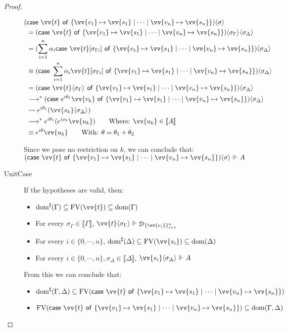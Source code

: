 \documentclass[runningheads,orivec,envcountsame,envcountsect]{llncs}
\newcommand\lra{\longrightarrow}
\newcommand\ansubst[2]{\ensuremath{\langle #1 \rangle_{#2}}}
\newcommand\dom[1]{\mathrm{dom}(#1)}
\newcommand\sdom[1]{\mathrm{dom}^{\sharp}(#1)}
\newcommand\FV[1]{\mathrm{FV}(#1)}
\def\gencase#1#2#3#4#5{\ensuremath{\mathsf{case}~#1~\mathsf{of}~\{#2\mapsto #4 \mid \dotsb \mid #3\mapsto #5\}}}
\def\lraneq{\rightsquigarrow}
\def\eval{\lra^*}
\def\sem#1{\llbracket#1\rrbracket}
\def\real{\Vdash}
\newcommand\basis[1]{\ensuremath{\flat_{#1}}}
\newcommand\genbasis[3]{\ensuremath{\basis{\{#1\}_{#2}^{#3}}}}
\begin{document}
\begin{proof}
\begin{description}
    \begin{align*}
        (&\gencase{\vv{t}}{\vv{v_1}}{\vv{v_n}}{\vv{s_1}}{\vv{s_n}})\ansubst{\sigma}{}\\ 
        &= (\gencase{\vv{t}}{\vv{v_1}}{\vv{v_n}}{\vv{s_1}}{\vv{s_n}})\ansubst{\sigma_\Gamma}{}\ansubst{\sigma_\Delta}{}\\
        &= (\sum_{i=1}^{n}\alpha_i \gencase{\vv{t}[\sigma_{\Gamma i}]}{\vv{v_1}}{\vv{v_n}}{\vv{s_1}}{\vv{s_n}})\ansubst{\sigma_\Delta}{} \\
        &\equiv (\gencase{\sum_{i=1}^{n} \alpha_i \vv{t}[\sigma_{\Gamma i}]}{\vv{v_1}}{\vv{v_n}}{\vv{s_1}}{\vv{s_n}})\ansubst{\sigma_\Delta}{}\\
        &=(\gencase{\vv{t}\ansubst{\sigma_\Gamma}{}}{\vv{v_1}}{\vv{v_n}}{\vv{s_1}}{\vv{s_n}})\ansubst{\sigma_\Delta}{}\\
        &\eval(\gencase{e^{i\theta_1}\vv{v_k}}{\vv{v_1}}{\vv{v_n}}{\vv{s_1}}{\vv{s_n}})\ansubst{\sigma_\Delta}{}\\
        &\lraneq e^{i\theta_1}(\vv{s_k}\ansubst{\sigma_\Delta}{})\\
        &\eval e^{i\theta_1}(e^{i\rho_k} \vv{u_k})\qquad\text{Where: }\vv{u_k}\in\sem{A}\\
        &\equiv e^{i\theta} \vv{u_k}\qquad\text{With: }\theta=\theta_1 +\theta_2
    \end{align*}
    
    Since we pose no restriction on $k$, we can conclude that: $(\gencase{\vv{t}}{\vv{v_1}}{\vv{v_n}}{\vv{s_1}}{\vv{s_n}})\ansubst{\sigma}{}\real A$

    \item[UnitCase] If the hypotheses are valid, then:
    \begin{itemize}
        \item $\sdom{\Gamma}\subseteq \FV{\vv{t}}\subseteq \dom{\Gamma}$
        \item For every $\sigma_\Gamma\in\sem{\Gamma}$, $\vv{t}\ansubst{\sigma_\Gamma}{}\real\sharp\genbasis{\vv{v_i}}{i=1}{n}$
        \item For every $i\in\{0,\dotsb ,n\}$, $\sdom{\Delta}\subseteq \FV{\vv{s_i}}\subseteq \dom{\Delta}$
        \item For every $i\in\{0,\dotsb ,n\}, \sigma_\Delta\in\sem{\Delta}$, $\vv{s_i}\ansubst{\sigma_\Delta}{}\real A$
    \end{itemize}
    
    From this we can conclude that:
    
    \begin{itemize}
        \item $\sdom{\Gamma,\Delta}\subseteq \FV{\gencase{\vv{t}}{\vv{v_1}}{\vv{v_n}}{\vv{s_1}}{\vv{s_n}}}$
        \item $\FV{\gencase{\vv{t}}{\vv{v_1}}{\vv{v_n}}{\vv{s_1}}{\vv{s_n}}}\subseteq \dom{\Gamma,\Delta}$
    \end{itemize}
    

\end{description}
\end{proof}
\end{document}
